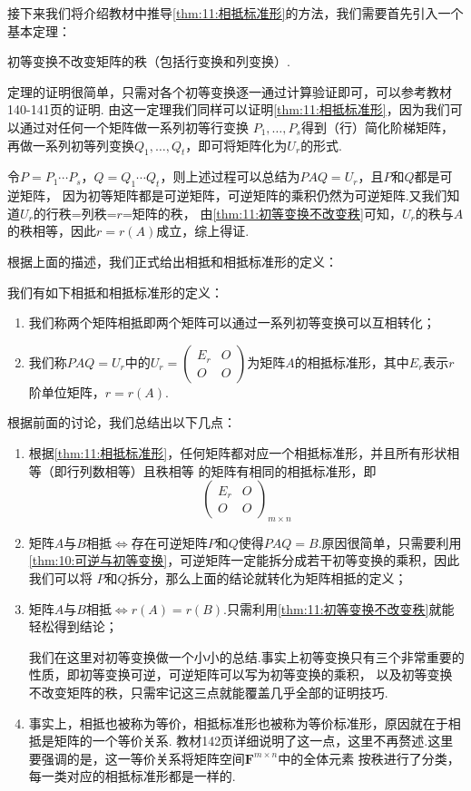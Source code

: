接下来我们将介绍教材中推导\autoref{thm:11:相抵标准形}的方法，我们需要首先引入一个基本定理：
\begin{theorem}\label{thm:11:初等变换不改变秩}
    初等变换不改变矩阵的秩（包括行变换和列变换）.
\end{theorem}
定理的证明很简单，只需对各个初等变换逐一通过计算验证即可，可以参考教材140-141页的证明.
由这一定理我们同样可以证明\autoref{thm:11:相抵标准形}，因为我们可以通过对任何一个矩阵做一系列初等行变换
$P_1,\ldots,P_s$得到（行）简化阶梯矩阵，再做一系列初等列变换$Q_1,\ldots,Q_t$，即可将矩阵化为$U_r$的形式.

令$P=P_1\cdots P_s$，$Q=Q_1\cdots Q_t$，则上述过程可以总结为$PAQ=U_r$，且$P$和$Q$都是可逆矩阵，
因为初等矩阵都是可逆矩阵，可逆矩阵的乘积仍然为可逆矩阵.又我们知道$U_r$的行秩=列秩=$r$=矩阵的秩，
由\autoref{thm:11:初等变换不改变秩}可知，$U_r$的秩与$A$的秩相等，因此$r=r(A)$成立，综上得证.

根据上面的描述，我们正式给出相抵和相抵标准形的定义：
\begin{definition}
    我们有如下相抵和相抵标准形的定义：
    \begin{enumerate}
        \item 我们称两个矩阵相抵即两个矩阵可以通过一系列初等变换可以互相转化；
        \item 我们称$PAQ=U_r$中的$U_r=\begin{pmatrix}
            E_r & O \\ O & O
        \end{pmatrix}$为矩阵$A$的相抵标准形，其中$E_r$表示$r$阶单位矩阵，$r=r(A)$.
    \end{enumerate}
\end{definition}

根据前面的讨论，我们总结出以下几点：
\begin{enumerate}
    \item 根据\autoref{thm:11:相抵标准形}，任何矩阵都对应一个相抵标准形，并且所有形状相等（即行列数相等）且秩相等
    的矩阵有相同的相抵标准形，即\[\begin{pmatrix}
        E_r & O \\ O & O
    \end{pmatrix}_{m\times n}\]
    \item 矩阵$A$与$B$相抵$\iff$存在可逆矩阵$P$和$Q$使得$PAQ=B$.原因很简单，只需要利用
    \autoref{thm:10:可逆与初等变换}，可逆矩阵一定能拆分成若干初等变换的乘积，因此我们可以将
    $P$和$Q$拆分，那么上面的结论就转化为矩阵相抵的定义；
    \item 矩阵$A$与$B$相抵$\iff r(A)=r(B)$.只需利用\autoref{thm:11:初等变换不改变秩}就能轻松得到结论；
    
    我们在这里对初等变换做一个小小的总结.事实上初等变换只有三个非常重要的性质，即初等变换可逆，可逆矩阵可以写为初等变换的乘积，
    以及初等变换不改变矩阵的秩，只需牢记这三点就能覆盖几乎全部的证明技巧.

    \item 事实上，相抵也被称为等价，相抵标准形也被称为等价标准形，原因就在于相抵是矩阵的一个等价关系.
    教材142页详细说明了这一点，这里不再赘述.这里要强调的是，这一等价关系将矩阵空间$\mathbf{F}^{m\times n}$中的全体元素
    按秩进行了分类，每一类对应的相抵标准形都是一样的.
\end{enumerate}

